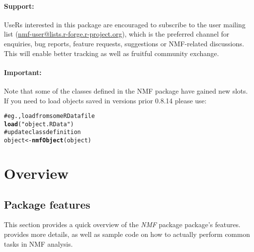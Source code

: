 \documentclass[a4paper]{article}\usepackage{graphicx, color}
\makeatletter
\newcommand{\hlfunctioncall}[1]{\textcolor[rgb]{0.501960784313725,0,0.329411764705882}{\textbf{#1}}}%
\newcommand{\hlstring}[1]{\textcolor[rgb]{0.6,0.6,1}{#1}}%
\newcommand{\hlcomment}[1]{\textcolor[rgb]{0.180392156862745,0.6,0.341176470588235}{#1}}%
\newenvironment{kframe}{%
 \def\at@end@of@kframe{}%
 \ifinner\ifhmode%
  \def\at@end@of@kframe{\end{minipage}}%
  \begin{minipage}{\columnwidth}%
 \fi\fi%
 \def\FrameCommand##1{\hskip\@totalleftmargin \hskip-\fboxsep
 \colorbox{shadecolor}{##1}\hskip-\fboxsep
     \hskip-\linewidth \hskip-\@totalleftmargin \hskip\columnwidth}%
 \MakeFramed {\advance\hsize-\width
   \@totalleftmargin\z@ \linewidth\hsize
   \@setminipage}}%
 {\par\unskip\endMakeFramed%
 \at@end@of@kframe}
\newenvironment{knitrout}{}{} %
\newcommand{\pkgname}[1]{\textit{#1}\xspace}
\newcommand{\Rpkg}[1]{\pkgname{#1} package\xspace}
\newcommand{\nmfpack}{\Rpkg{NMF}}
\makeatother
\begin{document}
\paragraph{Support:} UseRs interested in this package are encouraged to subscribe to the user mailing list (\href{https://lists.r-forge.r-project.org/mailman/listinfo/nmf-user}{nmf-user@lists.r-forge.r-project.org}), which is the preferred channel for enquiries, bug reports, feature requests, suggestions or NMF-related discussions.
This will enable better tracking as well as fruitful community exchange.

\paragraph{Important:} Note that some of the classes defined in the NMF package have gained new slots.
If you need to load objects saved in versions prior 0.8.14 please use:

\begin{knitrout}
\color{fgcolor}\begin{kframe}
\begin{alltt}
\hlcomment{# eg., load from some RData file}
\hlfunctioncall{load}(\hlstring{"object.RData"})
\hlcomment{# update class definition}
object <- \hlfunctioncall{nmfObject}(object)
\end{alltt}
\end{kframe}
\end{knitrout}


\pagebreak
\tableofcontents
\pagebreak

\section{Overview}

\subsection{Package features}

This section provides a quick overview of the \nmfpack package's features.
 provides more details, as well as sample code on how to actually perform common tasks in NMF analysis.
\end{document}
